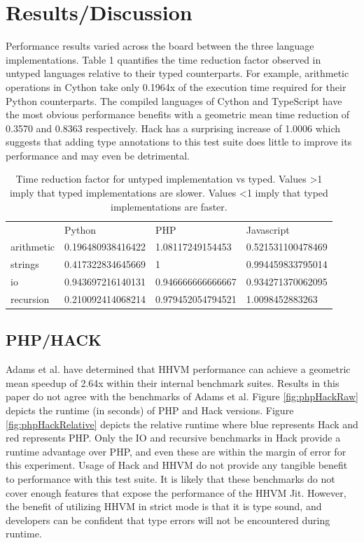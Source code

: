 \section{Results/Discussion}
Performance results varied across the board between the three language implementations. Table 1 quantifies the time reduction factor observed in untyped languages relative to their typed counterparts. For example, arithmetic operations in Cython take only 0.1964x of the execution time required for their Python counterparts. The compiled languages of Cython and TypeScript have the most obvious performance benefits with a geometric mean time reduction of 0.3570 and 0.8363 respectively. Hack has a surprising increase of 1.0006 which suggests that adding type annotations to this test suite does little to improve its performance and may even be detrimental. 

\begin{table}[H]
\centering
\begin{tabular}{llll}
           & Python            & PHP               & Javascript        \\
arithmetic & 0.196480938416422 & 1.08117249154453  & 0.521531100478469 \\
strings    & 0.417322834645669 & 1                 & 0.994459833795014 \\
io         & 0.943697216140131 & 0.946666666666667 & 0.934271370062095 \\
recursion  & 0.210092414068214 & 0.979452054794521 & 1.0098452883263  
\end{tabular}
\caption{Time reduction factor for untyped implementation vs typed. Values \textgreater 1 imply that typed implementations are slower. Values \textless 1 imply that typed implementations are faster.}\label{tab:slowdownfactor}
\end{table}

\subsection{PHP/HACK}
Adams et al. \cite{Adams:2014:HVM:2660193.2660199} have determined that HHVM performance can achieve a geometric mean speedup of 2.64x within their internal benchmark suites. Results in this paper do not agree with the benchmarks of Adams et al. Figure \ref{fig:phpHackRaw} depicts the runtime (in seconds) of PHP and Hack versions. Figure \ref{fig:phpHackRelative} depicts the relative runtime where blue represents Hack and red represents PHP. Only the IO and recursive benchmarks in Hack provide a runtime advantage over PHP, and even these are within the margin of error for this experiment. Usage of Hack and HHVM do not provide any tangible benefit to performance with this test suite. It is likely that these benchmarks do not cover enough features that expose the performance of the HHVM Jit. However, the benefit of utilizing HHVM in strict mode is that it is type sound, and developers can be confident that type errors will not be encountered during runtime. 

